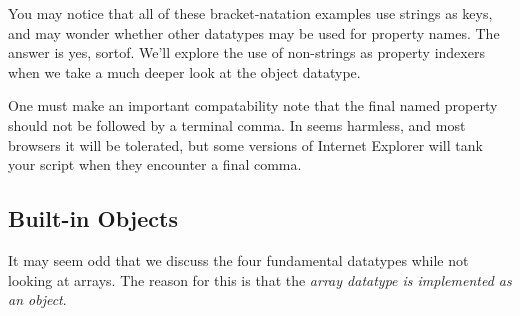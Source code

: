 \documentclass[11pt,letter]{book}
\begin{document}
    You may notice that all of these bracket-natation examples use strings as keys, and may wonder
    whether other datatypes may be used for property names. The answer is yes, sortof. We'll explore 
    the use of non-strings as property indexers when we take a much deeper look at the object 
    datatype.
    
    One must make an important compatability note that the final named property should not be 
    followed by a terminal comma. In seems harmless, and most browsers it will be tolerated, but 
    some versions of Internet Explorer will tank your script when they encounter a final comma.
    
    \subsection{Built-in Objects}
    It may seem odd that we discuss the four fundamental datatypes while not looking at arrays.
    The reason for this is that the \emph{array datatype is implemented as an object}.
    
    
\end{document}
